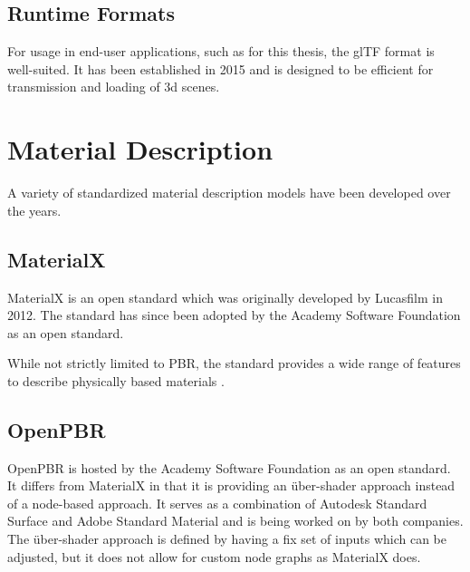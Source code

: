 \subsection{Runtime Formats}

For usage in end-user applications, such as for this thesis, the glTF format is well-suited. It has been established in 2015 and is designed to be efficient for transmission and loading of 3d scenes.

\section{Material Description}

A variety of standardized material description models have been developed over the years.

\subsection{MaterialX}

MaterialX is an open standard which was originally developed by Lucasfilm in 2012. The standard has since been adopted by the Academy Software Foundation as an open standard.

While not strictly limited to PBR, the standard provides a wide range of features to describe physically based materials \cite{Harrysson2019}.

\subsection{OpenPBR}

OpenPBR is hosted by the Academy Software Foundation as an open standard. It differs from MaterialX in that it is providing an über-shader approach instead of a node-based approach. It serves as a combination of Autodesk Standard Surface and Adobe Standard Material and is being worked on by both companies. The über-shader approach is defined by having a fix set of inputs which can be adjusted, but it does not allow for custom node graphs as MaterialX does.
